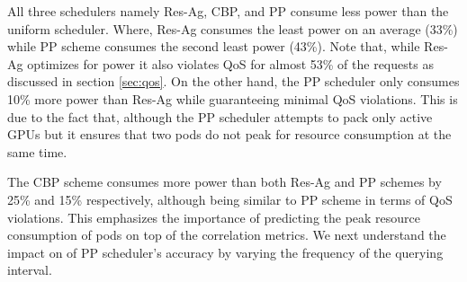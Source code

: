 All three schedulers namely Res-Ag, CBP, and PP consume less power than the uniform scheduler. Where, Res-Ag consumes the least power on an average (33\%) while PP scheme consumes the second least power (43\%). Note that, while Res-Ag optimizes for power it also violates QoS for almost 53\% of the requests as discussed in section \ref{sec:qos}. On the other hand, the PP scheduler only consumes 10\% more power than Res-Ag while guaranteeing minimal QoS violations. This is due to the fact that, although the PP scheduler attempts to pack only active GPUs but it ensures that two pods do not peak for resource consumption at the same time.

The CBP scheme consumes more power than both Res-Ag and PP schemes by 25\% and 15\% respectively, although being similar to PP scheme in terms of QoS violations. This emphasizes the importance of predicting the peak resource consumption of pods on top of the correlation metrics. We next understand the impact on of PP scheduler's accuracy by varying the frequency of the querying interval.

